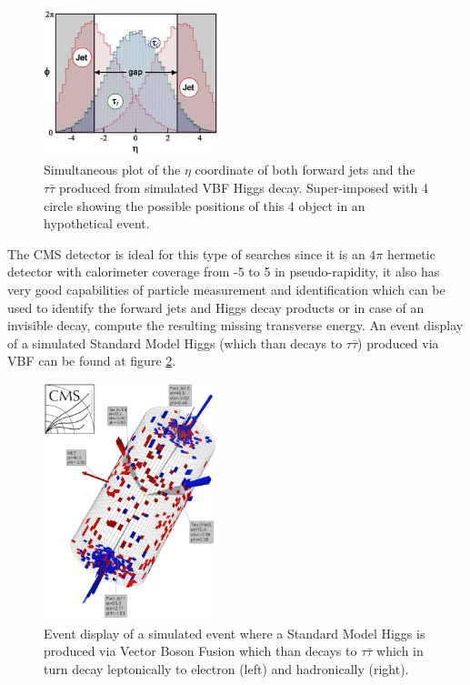 \documentclass[%
 reprint,
 amsmath,
 amssymb,
 aps,
 pra,
 showkeys
]{revtex4-1}
\begin{document}
\begin{figure}[ht]
\centering
\includegraphics[width=0.45\textwidth]{img/ObjectsRapidityGap.jpeg} 
\caption{Simultaneous plot of the $\eta$ coordinate of both forward jets and the $\tau\bar{\tau}$
produced from simulated VBF Higgs decay. Super-imposed with 4 circle showing the possible positions of this 4
object in an hypothetical event.}
\label{figure_VBF_HToTauTau_ObjectsRapidityGap}
\end{figure}

The CMS detector is ideal for this type of searches since it is an $4\pi$ hermetic detector with calorimeter coverage
from -5 to 5 in pseudo-rapidity, it also has very good capabilities of particle measurement and identification which can be used
to identify the forward jets and Higgs decay products or in case of an invisible decay, compute the resulting missing 
transverse energy. An event display of a simulated Standard Model Higgs (which than decays to $\tau\bar{\tau}$) produced 
via VBF can be found at figure \ref{figure_EventDisplay_VBF_HToTauTau_El-Had}.

\begin{figure}[ht]
\centering
\includegraphics[width=0.45\textwidth]{img/EventDisplay_VBF_HToTauTau_El-Had.png} 
\caption{Event display of a simulated event where a Standard Model Higgs is produced via Vector Boson Fusion
which than decays to $\tau\bar{\tau}$ which in turn decay leptonically to electron (left) and hadronically (right).}
\label{figure_EventDisplay_VBF_HToTauTau_El-Had}
\end{figure}
\end{document}
